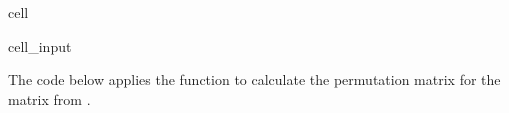 \documentclass[letterpaper,10pt,english]{jupyterBook}
\begin{document}
\begin{sphinxuseclass}{cell}\begin{sphinxVerbatimInput}

\begin{sphinxuseclass}{cell_input}
\begin{sphinxVerbatim}[commandchars=\\\{\}]
 
      \PYG{p}{[}\PYG{p}{]}
      
       
           \PYG{p}{[}\PYG{p}{]} 
              
             \PYG{p}{[}\PYG{p}{]}  
                   \PYG{p}{[}\PYG{p}{]} 
                
        \PYG{p}{[}\PYG{p}{[} \PYG{p}{]}\PYG{p}{]}  \PYG{p}{[}\PYG{p}{[} \PYG{p}{]}\PYG{p}{]}
        \PYG{p}{[}\PYG{p}{[} \PYG{p}{]}\PYG{p}{]}  \PYG{p}{[}\PYG{p}{[} \PYG{p}{]}\PYG{p}{]}
        
      
\end{sphinxVerbatim}

\end{sphinxuseclass}\end{sphinxVerbatimInput}

\end{sphinxuseclass}
\sphinxAtStartPar
The code below applies the function  to calculate the permutation matrix for the matrix from {\hyperref[\detokenize{6_Direct_methods/6.2_LUP_decomposition:pivoting-example}]{}}.
\end{document}
